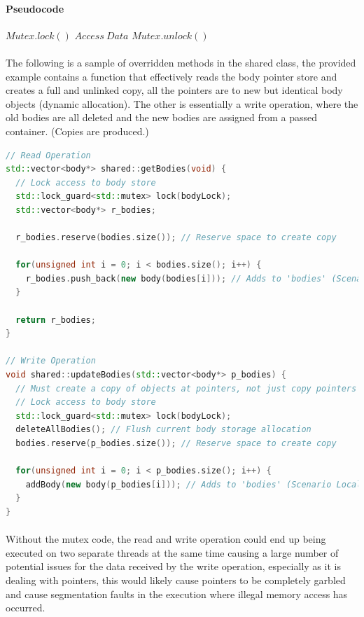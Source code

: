 \paragraph{Pseudocode}
\begin{algorithmic}[1]
\STATE $Mutex.lock()$ 
\STATE $Access~Data$ 
\STATE $Mutex.unlock()$ 
\end{algorithmic}

\paragraph{}
The following is a sample of overridden methods in the shared class, the provided example contains a function that effectively reads the body pointer store and creates a full and unlinked copy, all the pointers are to new but identical body objects (dynamic allocation). The other is essentially a write operation, where the old bodies are all deleted and the new bodies are assigned from a passed container. (Copies are produced.)

\begin{lstlisting}[language=c++]
// Read Operation
std::vector<body*> shared::getBodies(void) {
  // Lock access to body store
  std::lock_guard<std::mutex> lock(bodyLock);
  std::vector<body*> r_bodies;

  r_bodies.reserve(bodies.size()); // Reserve space to create copy

  for(unsigned int i = 0; i < bodies.size(); i++) {
    r_bodies.push_back(new body(bodies[i])); // Adds to 'bodies' (Scenario Local)
  }

  return r_bodies;
}

// Write Operation
void shared::updateBodies(std::vector<body*> p_bodies) {
  // Must create a copy of objects at pointers, not just copy pointers
  // Lock access to body store
  std::lock_guard<std::mutex> lock(bodyLock);
  deleteAllBodies(); // Flush current body storage allocation
  bodies.reserve(p_bodies.size()); // Reserve space to create copy

  for(unsigned int i = 0; i < p_bodies.size(); i++) {
    addBody(new body(p_bodies[i])); // Adds to 'bodies' (Scenario Local)
  }
}
\end{lstlisting}

\paragraph{}
Without the mutex code, the read and write operation could end up being executed on two separate threads at the same time causing a large number of potential issues for the data received by the write operation, especially as it is dealing with pointers, this would likely cause pointers to be completely garbled and cause segmentation faults in the execution where illegal memory access has occurred.

